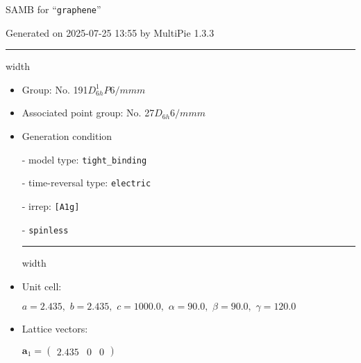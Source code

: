 \documentclass[fleqn,10pt,landscape]{article}
\begin{document}
\setcounter{MaxMatrixCols}{32}

\setlength{\baselineskip}{16pt}
\footnotesize
\begin{center}
\LARGE
SAMB for ``\texttt{graphene}''
\end{center}
\begin{flushright}
Generated on 2025-07-25 13:55 by MultiPie 1.3.3
\end{flushright}
\vspace{1cm}


 \hfil \hrule height 1mm width \textwidth \hfil

\begin{itemize}
\item Group: No. 191\quad$D_{6h}^{1}$\quad$P6/mmm$\quad[ hexagonal ]

\item Associated point group: No. 27\quad$D_{6h}$\quad$6/mmm$\quad[ hexagonal ]

\vspace{5mm}

\item Generation condition

\quad - model type: \texttt{tight_binding}

\quad - time-reversal type: \texttt{electric}

\quad - irrep: \texttt{[A1g]}

\quad - \texttt{spinless}


 \hfil \hrule height 1mm width \textwidth \hfil

\item Unit cell:

\quad $a=2.435,\,\, b=2.435,\,\, c=1000.0,\,\, \alpha=90.0,\,\, \beta=90.0,\,\, \gamma=120.0$

\item Lattice vectors:

\quad $\bm{a}_1=\begin{pmatrix} 2.435 & 0 & 0 \end{pmatrix}$


\end{itemize}
\end{document}
